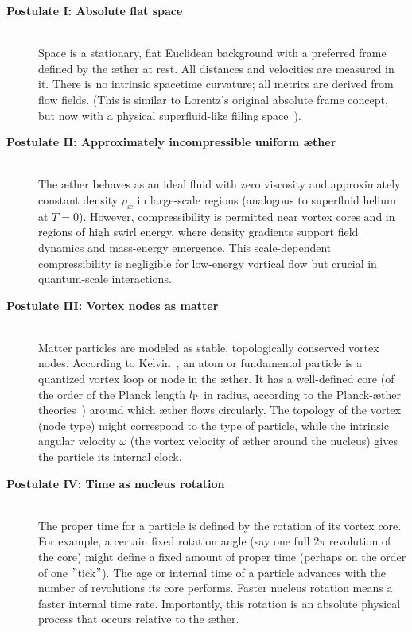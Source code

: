 \begin{description}
    \item[\textbf{Postulate I: Absolute flat space}] \hfill \\
    Space is a stationary, flat Euclidean background with a preferred frame defined by the æther at rest. All distances and velocities are measured in it. There is no intrinsic spacetime curvature; all metrics are derived from flow fields. (This is similar to Lorentz's original absolute frame concept, but now with a physical superfluid-like filling space~\cite{Winterberg2002-PlanckÆther}).

    \item[\textbf{Postulate II: Approximately incompressible uniform æther}] \hfill \\
    The æther behaves as an ideal fluid with zero viscosity and approximately constant density $\rho_\text{\ae}$ in large-scale regions (analogous to superfluid helium at $T=0$). However, compressibility is permitted near vortex cores and in regions of high swirl energy, where density gradients support field dynamics and mass-energy emergence. This scale-dependent compressibility is negligible for low-energy vortical flow but crucial in quantum-scale interactions.

    \item[\textbf{Postulate III: Vortex nodes as matter}] \hfill \\
    Matter particles are modeled as stable, topologically conserved vortex nodes. According to Kelvin~\cite{Kelvin1867-vortex}, an atom or fundamental particle is a quantized vortex loop or node in the æther. It has a well-defined core (of the order of the Planck length $l_{\textrm P}$ in radius, according to the Planck-æther theories~\cite{Winterberg2002-PlanckÆther}) around which æther flows circularly. The topology of the vortex (node type) might correspond to the type of particle, while the intrinsic angular velocity $\omega$ (the vortex velocity of æther around the nucleus) gives the particle its internal clock.

    \item[\textbf{Postulate IV: Time as nucleus rotation}] \hfill \\
    The proper time for a particle is defined by the rotation of its vortex core. For example, a certain fixed rotation angle (say one full $2\pi$ revolution of the core) might define a fixed amount of proper time (perhaps on the order of one \("\)tick\("\)). The age or internal time of a particle advances with the number of revolutions its core performs. Faster nucleus rotation means a faster internal time rate. Importantly, this rotation is an absolute physical process that occurs relative to the æther.


\end{description}

